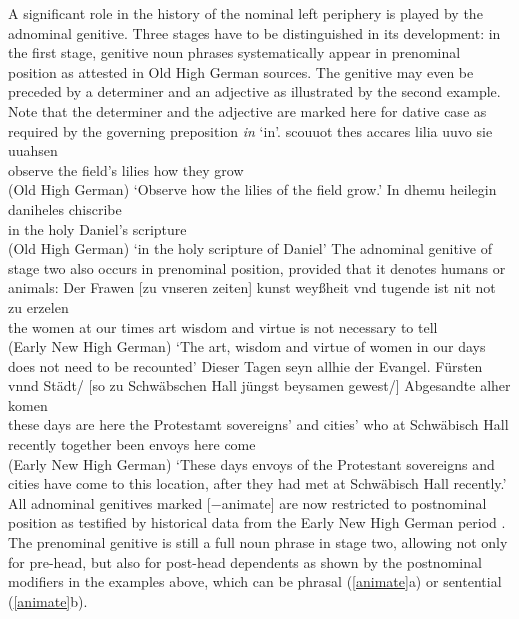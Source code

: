 \documentclass[output=paper
	        ,collection
	        ,collectionchapter
 	        ,biblatex
                ,babelshorthands
                ,newtxmath
                ,draftmode
                ,colorlinks, citecolor=brown
]{./langsci/langscibook}
\begin{document}
A significant role in the history of the nominal left periphery is played by the adnominal genitive. Three stages have to be distinguished in its development: in the first stage, genitive noun phrases systematically appear in prenominal position as attested in Old High German sources. The genitive may even be preceded by a determiner and an adjective as illustrated by the second example. Note that the determiner and the adjective are marked here for dative case as required by the governing preposition \textit{in} `in'.
\eal
\ex 
\gll scouuot thes accares lilia uuvo sie uuahsen \\ observe the field's lilies how they grow \\  \hfill (Old High German)
\glt `Observe how the lilies of the field grow.'
\ex 
\gll In dhemu heilegin daniheles chiscribe \\ in the holy Daniel's scripture  \\  \hfill (Old High German)
\glt `in the holy scripture of Daniel'
\zl
The adnominal genitive of stage two also occurs in prenominal position, provided that it denotes humans or animals:
\eal \label{animate}
\ex 
\gll Der Frawen [zu vnseren zeiten] kunst weyßheit vnd tugende ist nit not zu erzelen \\  the women at our times art wisdom and virtue is not necessary to tell  \\  \hfill (Early New High German)
\glt `The art, wisdom and virtue of women in our days does not need to be recounted'
\ex 
\gll Dieser Tagen seyn allhie der Evangel. Fürsten vnnd Städt/ [so zu Schwäbschen Hall jüngst beysamen gewest/] Abgesandte alher komen \\ these days are here the Protestamt sovereigns' and cities' who at Schwäbisch Hall recently together been envoys here come  \\\hfill (Early New High German)
\glt `These days envoys of the Protestant sovereigns and cities have come to this location, after they had met at Schwäbisch Hall recently.'	
\zl
All adnominal genitives marked [$-$animate] are now restricted to postnominal position as testified by historical data from the Early New High German period \citep{ebert88}. The prenominal genitive is still a full noun phrase in stage two, allowing not only for pre-head, but also for post-head dependents as shown by the postnominal modifiers in the examples above, which can be phrasal (\ref{animate}a) or sentential (\ref{animate}b).
\end{document}
